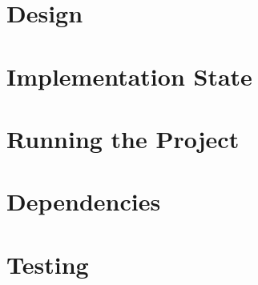\documentclass[12pt]{article}
\begin{document}
\maketitle


\section{Design}


\section{Implementation State}


\section{Running the Project}


\section{Dependencies}


\section{Testing}
\end{document}
